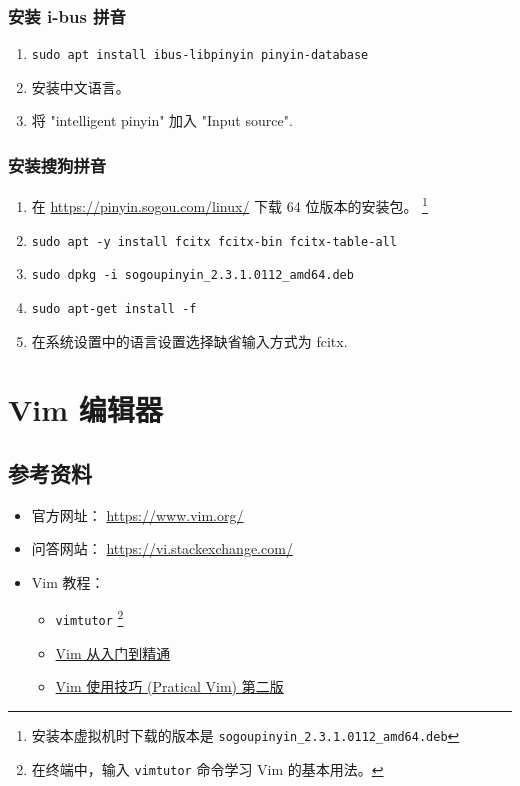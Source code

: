 \documentclass[
    11pt,
    cite=authoryear,
    device=normal,
    lang=cn,
    mode=simple,
    result=answer,
    toc=onecol,
]{elegantbook_sierxue}
\begin{document}
\subsubsection{安装 i-bus 拼音}%
\label{ssub:pinyin-i-bus}
\begin{enumerate}
    \item \lstinline{sudo apt install ibus-libpinyin pinyin-database}
    \item 安装中文语言。
    \item 将 "intelligent pinyin" 加入 "Input source".
\end{enumerate}

\subsubsection{安装搜狗拼音}%
\label{ssub:pinyin-sogou}
\begin{enumerate}
    \item 在 \href{https://pinyin.sogou.com/linux/}
        {https://pinyin.sogou.com/linux/} 下载 64 位版本的安装包。
        \footnote{安装本虚拟机时下载的版本是
            \lstinline{sogoupinyin_2.3.1.0112_amd64.deb}
        }
    \item \lstinline{sudo apt -y install fcitx fcitx-bin fcitx-table-all}
    \item \lstinline{sudo dpkg -i sogoupinyin_2.3.1.0112_amd64.deb}
    \item \lstinline{sudo apt-get install -f}
    \item 在系统设置中的语言设置选择缺省输入方式为 fcitx.
\end{enumerate}

\newpage
\section{Vim 编辑器}%
\label{sec:vim}

\subsection{参考资料}%
\label{sub:vim-refs}

\begin{itemize}
    \item 官方网址： \href{https://www.vim.org/}{https://www.vim.org/}
    \item 问答网站：
        \href{https://vi.stackexchange.com/}{https://vi.stackexchange.com/}
    \item Vim 教程：
        \begin{itemize}
            \item \lstinline{vimtutor}
                \footnote{在终端中，输入 \lstinline{vimtutor} 命令学习 Vim
                的基本用法。}
            \item \href{https://github.com/wsdjeg/vim-galore-zh_cn}
                {Vim 从入门到精通}
            \item \href{https://item.jd.com/12056490.html}
                {Vim 使用技巧 (Pratical Vim) 第二版}
        \end{itemize}
\end{itemize}
\end{document}

